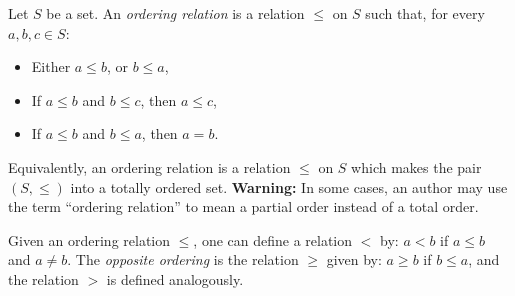 \documentclass[12pt]{article}
\begin{document}
Let $S$ be a set. An {\em ordering relation} is a relation $\leq$ on $S$ such that, for every $a,b,c \in S$:
\begin{itemize}
\item Either $a \leq b$, or $b \leq a$,
\item If $a \leq b$ and $b \leq c$, then $a \leq c$,
\item If $a \leq b$ and $b \leq a$, then $a = b$.
\end{itemize}

Equivalently, an ordering relation is a relation $\leq$ on $S$ which makes the pair $(S,\leq)$ into a totally ordered set. {\bf Warning:} In some cases, an author may use the term ``ordering relation'' to mean a partial order instead of a total order.

Given an ordering relation $\leq$, one can define a relation $<$ by: $a < b$ if $a \leq b$ and $a \neq b$. The {\em opposite ordering} is the relation $\geq$ given by: $a \geq b$ if $b \leq a$, and the relation $>$ is defined analogously.
\end{document}
